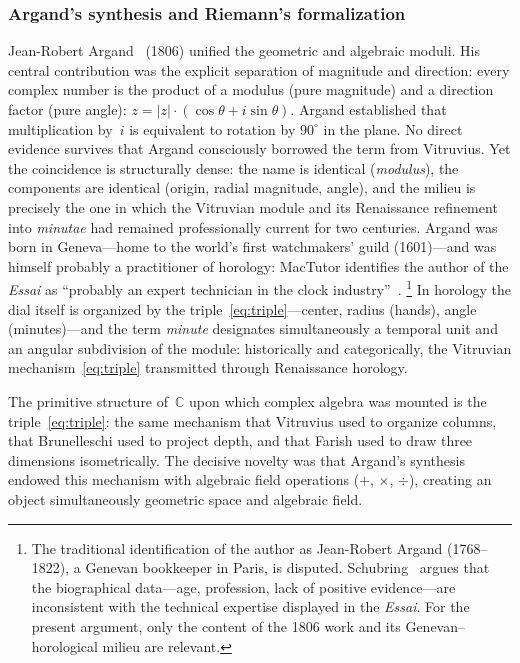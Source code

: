 \subsubsection{Argand's synthesis and Riemann's formalization}

Jean-Robert Argand~\cite{argand1874essai} (1806) unified the geometric and algebraic moduli.
His central contribution was the explicit separation of magnitude and
direction: every complex number is the product of a modulus (pure
magnitude) and a direction factor (pure angle):
$z = |z| \cdot (\cos\theta + i\sin\theta)$.  Argand established that
multiplication by~$i$ is equivalent to rotation by $90^\circ$ in the
plane.  No direct evidence survives that Argand consciously borrowed
the term from Vitruvius.  Yet the coincidence is
structurally dense: the name is identical (\emph{modulus}), the
components are identical (origin, radial magnitude, angle), and the
milieu is precisely the one in which the Vitruvian module and its
Renaissance refinement into \emph{minutae} had remained
professionally current for two centuries.  Argand was born in
Geneva---home to the world's first watchmakers' guild
(1601)---and was himself probably a practitioner of horology:
MacTutor identifies the author of the \emph{Essai} as ``probably
an expert technician in the clock
industry''~\cite{mactutor_argand}.%
\footnote{The traditional identification of the author as
Jean-Robert Argand (1768--1822), a Genevan bookkeeper in Paris, is
disputed.  Schubring~\cite{mactutor_argand} argues that
the biographical data---age, profession, lack of positive
evidence---are inconsistent with the technical expertise displayed in
the \emph{Essai}.  For the present argument, only the content of the
1806 work and its Genevan--horological milieu are relevant.}
In horology the dial itself is organized by the
triple~\cref{eq:triple}---center, radius (hands), angle
(minutes)---and the term \emph{minute} designates simultaneously a
temporal unit and an angular subdivision of the module: historically
and categorically, the Vitruvian mechanism~\cref{eq:triple}
transmitted through Renaissance horology.

The primitive structure of~$\mathbb{C}$ upon which complex
algebra was mounted is the triple~\cref{eq:triple}: the same mechanism
that Vitruvius used to organize columns, that Brunelleschi used to
project depth, and that Farish used to draw three dimensions
isometrically.  The decisive novelty was that Argand's synthesis endowed
this mechanism with algebraic field operations ($+$, $\times$, $\div$),
creating an object simultaneously geometric space and algebraic field.

